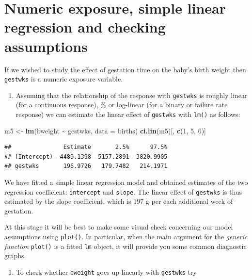 \documentclass[
]{book}
\newenvironment{Shaded}{\begin{snugshade}}{\end{snugshade}}
\newcommand{\AttributeTok}[1]{\textcolor[rgb]{0.13,0.29,0.53}{#1}}
\newcommand{\DecValTok}[1]{\textcolor[rgb]{0.00,0.00,0.81}{#1}}
\newcommand{\FunctionTok}[1]{\textcolor[rgb]{0.13,0.29,0.53}{\textbf{#1}}}
\newcommand{\NormalTok}[1]{#1}
\newcommand{\OtherTok}[1]{\textcolor[rgb]{0.56,0.35,0.01}{#1}}
\newcommand{\SpecialCharTok}[1]{\textcolor[rgb]{0.81,0.36,0.00}{\textbf{#1}}}
\providecommand{\tightlist}{%
  \setlength{\itemsep}{0pt}\setlength{\parskip}{0pt}}
\begin{document}
\section{Numeric exposure, simple linear regression and checking assumptions}\label{numeric-exposure-simple-linear-regression-and-checking-assumptions}

If we wished to study the effect of gestation time on the baby's birth
weight then \texttt{gestwks} is a numeric exposure variable.

\begin{enumerate}
\def\labelenumi{\arabic{enumi}.}
\tightlist
\item
  Assuming that the relationship
  of the response with \texttt{gestwks} is roughly linear
  (for a continuous response),
  \% or log-linear (for a binary or failure rate response)
  we can estimate the linear effect of \texttt{gestwks} with \texttt{lm()} as follows:
\end{enumerate}

\begin{Shaded}
\begin{Highlighting}[]
\NormalTok{m5 }\OtherTok{\textless{}{-}} \FunctionTok{lm}\NormalTok{(bweight }\SpecialCharTok{\textasciitilde{}}\NormalTok{ gestwks, }\AttributeTok{data =}\NormalTok{ births)}
\FunctionTok{ci.lin}\NormalTok{(m5)[, }\FunctionTok{c}\NormalTok{(}\DecValTok{1}\NormalTok{, }\DecValTok{5}\NormalTok{, }\DecValTok{6}\NormalTok{)]}
\end{Highlighting}
\end{Shaded}

\begin{verbatim}
##               Estimate       2.5%      97.5%
## (Intercept) -4489.1398 -5157.2891 -3820.9905
## gestwks       196.9726   179.7482   214.1971
\end{verbatim}

We have fitted a simple linear regression model and
obtained estimates of the
two regression coefficient: \texttt{intercept} and \texttt{slope}.
The linear effect of \texttt{gestwks} is thus estimated by the
slope coefficient, which is \(197\) g per each additional week of gestation.

At this stage it will be best to make some visual check concerning
our model assumptions using \texttt{plot()}. In particular, when the main argument
for the \emph{generic function} \texttt{plot()} is a fitted \texttt{lm} object,
it will provide you some common diagnostic graphs.

\begin{enumerate}
\def\labelenumi{\arabic{enumi}.}
\setcounter{enumi}{1}
\tightlist
\item
  To check whether \texttt{bweight} goes up linearly with \texttt{gestwks} try
\end{enumerate}
\end{document}
